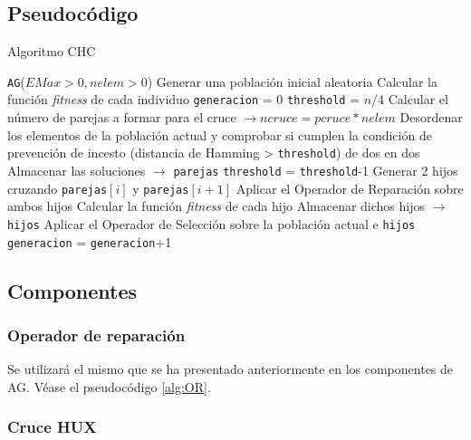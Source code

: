 \subsection{Pseudocódigo}

\begin{algorithm}
\caption{Algoritmo CHC}\label{alg:CHC}
\begin{algorithmic}[1]
\Procedure \texttt{AG}($EMax > 0, nelem > 0$)
\State Generar una población inicial aleatoria
\State Calcular la función \textit{fitness} de cada individuo
\State \texttt{generacion} = 0
\State \texttt{threshold} = $n$/4
	\State Calcular el número de parejas a formar para el cruce $\xrightarrow{}{} ncruce = pcruce*nelem$
	\State Desordenar los elementos de la población actual y comprobar si cumplen la condición de prevención de incesto (distancia de Hamming > \texttt{threshold}) de dos en dos
		\State Almacenar las soluciones $\xrightarrow{}{}$ \texttt{parejas}
	\EndIf
			\State \texttt{threshold} = \texttt{threshold}-1
		\EndIf
	\Else
			\State Generar 2 hijos cruzando \texttt{parejas}$[i]$ y \texttt{parejas}$[i+1]$
			\State Aplicar el Operador de Reparación sobre ambos hijos
			\State Calcular la función \textit{fitness} de cada hijo
			\State Almacenar dichos hijos $\xrightarrow{}{}$ \texttt{hijos}
		\EndFor
		\State Aplicar el Operador de Selección sobre la población actual e \texttt{hijos}
	\EndIf
	\State \texttt{generacion} = \texttt{generacion}+1
\EndWhile
\EndProcedure
\end{algorithmic}
\end{algorithm}

\subsection{Componentes}
\subsubsection{Operador de reparación}
Se utilizará el mismo que se ha presentado anteriormente en los componentes de AG. 
Véase el pseudocódigo \ref{alg:OR}.

\subsubsection{Cruce HUX}

